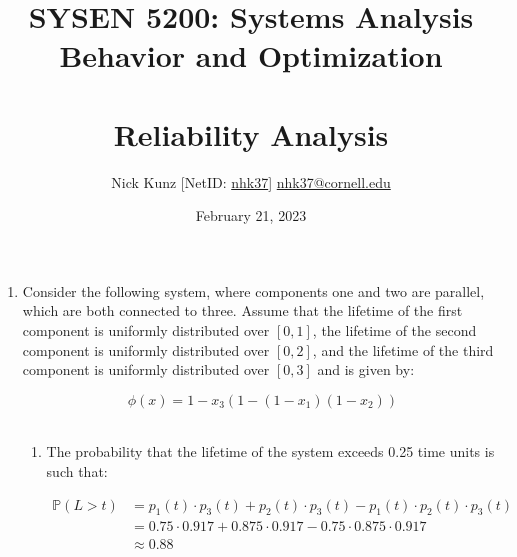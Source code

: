 \documentclass{article}
\begin{document}
\title{SYSEN 5200: Systems Analysis Behavior and Optimization\\~\\
    \Large Reliability Analysis
}
\author{
    Nick Kunz [NetID: \url{nhk37}] \hyperlink{nhk37@cornell.edu}{nhk37@cornell.edu}}
\date{February 21, 2023}
\maketitle
\thispagestyle{fancy}

\begin{enumerate}

    \item Consider the following system, where components one and two are parallel, which are both connected to three. Assume that the lifetime of the first component is uniformly distributed over $[0,1]$, the lifetime of the second component is uniformly distributed over $[0,2]$, and the lifetime of the third component is uniformly distributed over $[0,3]$ and is given by:
    
    \begin{equation}
        \phi(x)=1-x_3(1-(1-x_1)(1-x_2))
    \end{equation}\\
    \begin{enumerate}
        \item The probability that the lifetime of the system exceeds 0.25 time units is such that:

        \begin{equation}
            \begin{split}
                 \mathbb{P}{(L > t)} &= p_1(t) \cdot p_3(t) + p_2(t) \cdot p_3(t) - p_1(t) \cdot p_2(t) \cdot p_3(t)\\
                 &= 0.75 \cdot 0.917 + 0.875 \cdot 0.917 - 0.75 \cdot 0.875 \cdot 0.917\\
                 &\approx 0.88
            \end{split}
        \end{equation}


\end{enumerate}
\end{enumerate}
\end{document}
